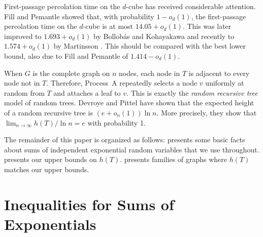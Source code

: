 \documentclass[lotsofwhite]{patmorin}
\begin{document}
First-passage percolation time on the $d$-cube has received considerable
attention. Fill and Pemantle \cite{fill.pemantle:percolation} showed
that, with probability $1-o_d(1)$, the first-passage percolation time on
the $d$-cube is at most $14.05+o_d(1)$.  This was later improved to $1.693
+o_d(1)$ by Bollob\'as and Kohayakawa \cite{bollobas.kohayakawa:on} and
recently to  $1.574 +o_d(1)$ by Martinsson \cite{martinsson:unoriented}.
This should be compared with the best lower bound, also due to Fill and
Pemantle \cite{fill.pemantle:percolation} of $1.414-o_d(1)$.

When $G$ is the complete graph on $n$ nodes, each node in $T$ is adjacent
to every node not in $T$.  Therefore, Process~A repeatedly selects
a node $v$ uniformly at random from $T$ and attaches a leaf to $v$.
This is exactly the \emph{random recursive tree} model of random trees.
Devroye \cite{devroye:branching} and Pittel \cite{pittel:note} have shown
that the expected height of a random recursive tree is $(e+o_n(1))\ln n$.
More precisely, they show that $\lim_{n\to\infty} h(T)/\ln n = e$ with
probability 1. 

The remainder of this paper is organized as follows:
 presents some basic facts about sums of
independent exponential random variables that we use throughout.
 presents our upper bounds on $h(T)$.
 presents families of graphs where $h(T)$ matches our upper
bounds.

\section{Inequalities for Sums of Exponentials}
\end{document}
